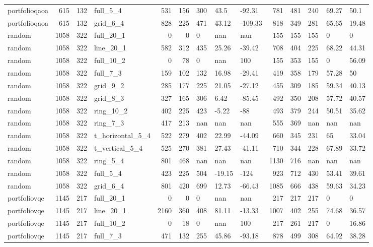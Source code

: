 \begin{longtable}{lrrlrrlllrrlll}
portfolioqaoa & 615 & 132 & full\_5\_4 & 531 & 156 & 300 & 43.5 & -92.31 & 781 & 481 & 240 & 69.27 & 50.1 \\
portfolioqaoa & 615 & 132 & grid\_6\_4 & 828 & 225 & 471 & 43.12 & -109.33 & 818 & 349 & 281 & 65.65 & 19.48 \\
random & 1058 & 322 & full\_20\_1 & 0 & 0 & 0 & nan & nan & 155 & 155 & 155 & 0 & 0 \\
random & 1058 & 322 & line\_20\_1 & 582 & 312 & 435 & 25.26 & -39.42 & 708 & 404 & 225 & 68.22 & 44.31 \\
random & 1058 & 322 & full\_10\_2 & 0 & 78 & 0 & nan & 100 & 155 & 353 & 155 & 0 & 56.09 \\
random & 1058 & 322 & full\_7\_3 & 159 & 102 & 132 & 16.98 & -29.41 & 419 & 358 & 179 & 57.28 & 50 \\
random & 1058 & 322 & grid\_9\_2 & 285 & 177 & 225 & 21.05 & -27.12 & 455 & 309 & 185 & 59.34 & 40.13 \\
random & 1058 & 322 & grid\_8\_3 & 327 & 165 & 306 & 6.42 & -85.45 & 492 & 350 & 208 & 57.72 & 40.57 \\
random & 1058 & 322 & ring\_10\_2 & 402 & 225 & 423 & -5.22 & -88 & 493 & 379 & 244 & 50.51 & 35.62 \\
random & 1058 & 322 & ring\_7\_3 & 417 & 213 & nan & nan & nan & 555 & 369 & nan & nan & nan \\
random & 1058 & 322 & t\_horizontal\_5\_4 & 522 & 279 & 402 & 22.99 & -44.09 & 660 & 345 & 231 & 65 & 33.04 \\
random & 1058 & 322 & t\_vertical\_5\_4 & 525 & 270 & 381 & 27.43 & -41.11 & 710 & 344 & 228 & 67.89 & 33.72 \\
random & 1058 & 322 & ring\_5\_4 & 801 & 468 & nan & nan & nan & 1130 & 716 & nan & nan & nan \\
random & 1058 & 322 & full\_5\_4 & 423 & 225 & 504 & -19.15 & -124 & 923 & 712 & 430 & 53.41 & 39.61 \\
random & 1058 & 322 & grid\_6\_4 & 801 & 420 & 699 & 12.73 & -66.43 & 1085 & 666 & 438 & 59.63 & 34.23 \\
portfoliovqe & 1145 & 217 & full\_20\_1 & 0 & 0 & 0 & nan & nan & 217 & 217 & 217 & 0 & 0 \\
portfoliovqe & 1145 & 217 & line\_20\_1 & 2160 & 360 & 408 & 81.11 & -13.33 & 1007 & 402 & 255 & 74.68 & 36.57 \\
portfoliovqe & 1145 & 217 & full\_10\_2 & 0 & 18 & 0 & nan & 100 & 217 & 261 & 217 & 0 & 16.86 \\
portfoliovqe & 1145 & 217 & full\_7\_3 & 471 & 132 & 255 & 45.86 & -93.18 & 878 & 499 & 308 & 64.92 & 38.28 \\

\end{longtable}
